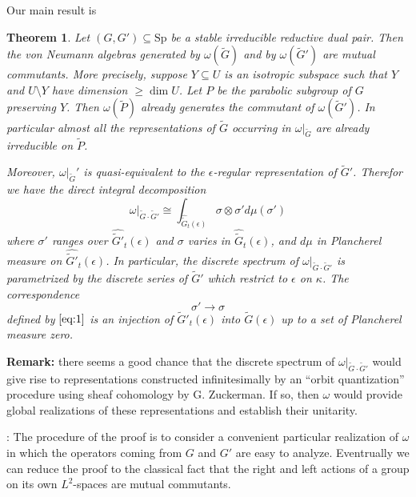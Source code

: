 \documentclass[12pt]{amsart}
\newtheorem{thm}{Theorem}
\def\Sp{{\mathrm{Sp}}}
\def\tP{{\widetilde{P}}}
\def\tG{{\widetilde{G}}}
\def\htG{{\widetilde{G}}}
\def\kk{\kappa}
\begin{document}
Our main result is 

\begin{thm}\label{thm:1}
Let $(G,G')\subseteq \Sp$ be a stable irreducible reductive dual pair. 
Then the von Neumann algebras generated by $\omega(\tG)$ and by $\omega(\tG')$
are mutual commutants. 
More precisely, suppose $Y\subseteq U$ is an isotropic subspace such that
$Y$ and $U\setminus Y$ have dimension $\geq \dim U$. Let $P$ be 
the parabolic subgroup of $G$ preserving $Y$. 
Then $\omega(\tP)$ already generates the commutant of $\omega(\tG')$. 
In particular almost all the representations of $\tG$ 
occurring in $\omega|_\tG$ are already irreducible on $\tP$.

Moreover, $\omega|_\tG'$ is quasi-equivalent to the $\epsilon$-regular 
representation of $\tG'$. Therefor we have the direct integral decomposition
\begin{equation}\label{eq:1}
\omega|_{\tG\cdot\tG'}\cong \int_{\widehat{\tG}_t(\epsilon)}\sigma\otimes \sigma' 
d\mu(\sigma')
\end{equation}
where $\sigma'$ ranges over $\widehat{\tG'}_t(\epsilon)$ and $\sigma$
varies in $\widehat{\tG}_t(\epsilon)$, and $d\mu$ in Plancherel measure on 
$\widehat{\tG'}_t(\epsilon)$. In particular, the discrete spectrum of 
$\omega|_{\tG\cdot\tG'}$ is parametrized by the discrete series of $\tG'$
which restrict to $\epsilon$ on $\kk$. The correspondence
\[
\sigma'\to\sigma 
\]
defined by $\ref{eq:1}$ is an injection of $\htG'_t(\epsilon)$ 
into $\htG(\epsilon)$ up to a set of Plancherel measure zero.
\end{thm}

{\bf Remark:} there seems a good chance that the discrete spectrum of 
$\omega|_{\tG\cdot \tG'}$ would give rise to representations constructed 
infinitesimally by an ``orbit quantization'' procedure using sheaf cohomology 
by G. Zuckerman. If so, then $\omega$ would provide global realizations of
these representations and establish their unitarity.

\proof: The procedure of the proof is to consider a convenient particular
realization of $\omega$ in which the operators coming from
$G$ and $G'$ are easy to analyze. Eventrually we can reduce the proof to the
classical fact \cite{Dixmier1982} that the right and left actions of a 
group on its own $L^2$-spaces are mutual commutants.
\end{document}

